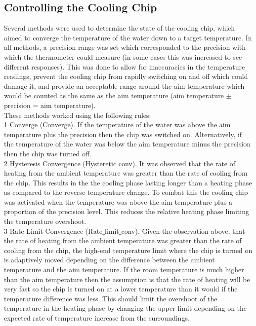\documentclass[10pt]{article}
\begin{document}

\subsection*{Controlling the Cooling Chip}
Several methods were used to determine the state of the cooling chip, which aimed to converge the temperature of the water down to a target temperature. In all methods, a precision range was set which corresponded to the precision with which the thermometer could measure (in some cases this was increased to see different responses). This was done to allow for inaccuracies in the temperature readings, prevent the cooling chip from rapidly switching on and off which could damage it, and provide an acceptable range around the aim temperature which would be counted as the same as the aim temperature (aim temperature $\pm$ precision = aim temperature).\\

These methods worked using the following rules:\\ %

1 Converge (Converge). If the temperature of the water was above the aim temperature plus the precision then the chip was switched on. Alternatively, if the temperature of the water was below the aim temperature minus the precision then the chip was turned off.\\

2 Hysteresis Convergence (Hysteretic$\_$conv). It was observed that the rate of heating from the ambient temperature was greater than the rate of cooling from the chip. This results in the the cooling phase lasting longer than a heating phase as compared to the reverse temperature change. To combat this the cooling chip was activated when the temperature was above the aim temperature plus a proportion of the precision level. This reduces the relative heating phase limiting the temperature overshoot.\\

3 Rate Limit Convergence (Rate$\_$limit$\_$conv). Given the observation above, that the rate of heating from the ambient temperature was greater than the rate of cooling from the chip, the high-end temperature limit where the chip is turned on is adaptively moved depending on the difference between the ambient temperature and the aim temperature. If the room temperature is much higher than the aim temperature then the assumption is that the rate of heating will be very fast so the chip is turned on at a lower temperature than it would if the temperature difference was less. This should limit the overshoot of the temperature in the heating phase by changing the upper limit depending on the expected rate of temperature increase from the surroundings. \\
\end{document}
